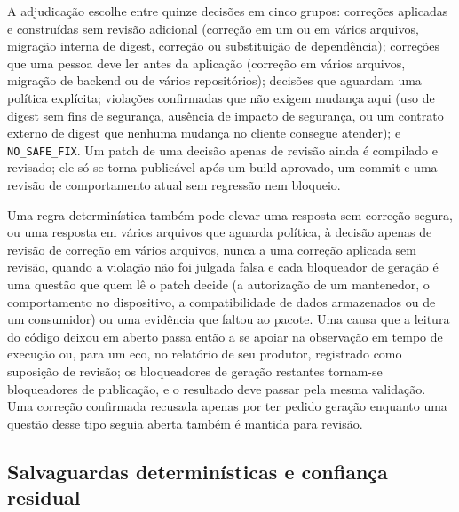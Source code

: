 \documentclass[conference]{IEEEtran}
\begin{document}
A adjudicação escolhe entre quinze decisões em cinco grupos: correções
aplicadas e construídas sem revisão adicional (correção em um ou em vários
arquivos, migração interna de digest, correção ou substituição de dependência);
correções que uma pessoa deve ler antes da aplicação (correção em vários
arquivos, migração de backend ou de vários repositórios); decisões que aguardam
uma política explícita; violações confirmadas que não exigem mudança aqui (uso
de digest sem fins de segurança, ausência de impacto de segurança, ou um
contrato externo de digest que nenhuma mudança no cliente consegue atender); e
\texttt{NO\_SAFE\_FIX}. Um patch de uma decisão apenas de revisão
ainda é compilado e revisado; ele só se torna publicável após um build aprovado,
um commit e uma revisão de comportamento atual sem regressão nem bloqueio.

Uma regra determinística também pode elevar uma resposta sem correção segura,
ou uma resposta em vários arquivos que aguarda política, à decisão apenas de
revisão de correção em vários arquivos, nunca a uma correção aplicada sem
revisão, quando a violação não foi julgada falsa e cada bloqueador de geração é
uma questão que quem lê o patch decide (a autorização de um mantenedor, o
comportamento no dispositivo, a compatibilidade de dados armazenados ou de um
consumidor) ou uma evidência que faltou ao pacote. Uma causa que a leitura do
código deixou em aberto passa então a se apoiar na observação em tempo de
execução ou, para um eco, no relatório de seu produtor, registrado como
suposição de revisão; os bloqueadores de geração restantes tornam-se
bloqueadores de publicação, e o resultado deve passar pela mesma validação.
Uma correção confirmada recusada apenas por ter pedido geração enquanto uma
questão desse tipo seguia aberta também é mantida para revisão.

\subsection{Salvaguardas determinísticas e confiança residual}
\end{document}
